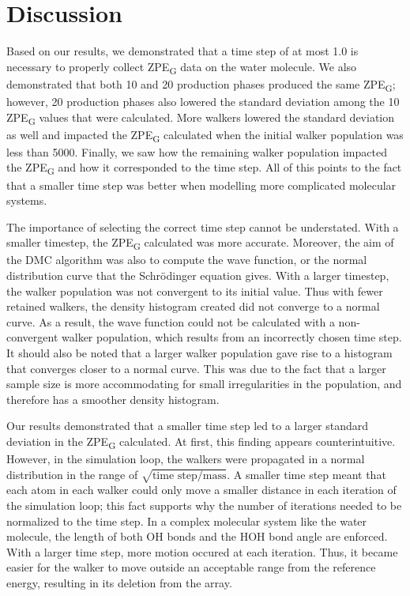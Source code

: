 \documentclass[journal=jacsat,manuscript=article]{achemso}
\begin{document}
\section{Discussion}

Based on our results, we demonstrated that a time step of at most 1.0 is necessary to properly collect ZPE\textsubscript{G} data on the water molecule. We also demonstrated that both 10 and 20 production phases produced the same ZPE\textsubscript{G}; however, 20 production phases also lowered the standard deviation among the 10 ZPE\textsubscript{G} values that were calculated. More walkers lowered the standard deviation as well and impacted the ZPE\textsubscript{G} calculated when the initial walker population was less than 5000. Finally, we saw how the remaining walker population impacted the ZPE\textsubscript{G} and how it corresponded to the time step. All of this points to the fact that a smaller time step was better when modelling more complicated molecular systems. 

The importance of selecting the correct time step cannot be understated. With a smaller timestep, the ZPE\textsubscript{G} calculated was more accurate. Moreover, the aim of the DMC algorithm was also to compute the wave function, or the normal distribution curve that the Schr\"odinger equation gives. With a larger timestep, the walker population was not convergent to its initial value. Thus with fewer retained walkers, the density histogram created did not converge to a normal curve. As a result, the wave function could not be calculated with a non-convergent walker population, which results from an incorrectly chosen time step. It should also be noted that a larger walker population gave rise to a histogram that converges closer to a normal curve. This was due to the fact that a larger sample size is more accommodating for small irregularities in the population, and therefore has a smoother density histogram. 

Our results demonstrated that a smaller time step led to a larger standard deviation in the ZPE\textsubscript{G} calculated. At first, this finding appears counterintuitive. However, in the simulation loop, the walkers were propagated in a normal distribution in the range of $\sqrt{\text{time step}/\text{mass}}$. A smaller time step meant that each atom in each walker could only move a smaller distance in each iteration of the simulation loop; this fact supports why the number of iterations needed to be normalized to the time step. In a complex molecular system like the water molecule, the length of both OH bonds and the HOH bond angle are enforced. With a larger time step, more motion occured at each iteration. Thus, it became easier for the walker to move outside an acceptable range from the reference energy, resulting in its deletion from the array. 
\end{document}
